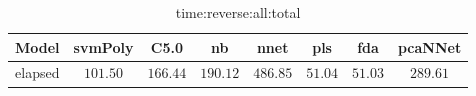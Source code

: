 \begin{table}[!ht]
	\centering
	\begin{tabular}{|c|c|c|c|c|c|c|c|}
		\hline
		Model & svmPoly & C5.0 & nb & nnet & pls & fda & pcaNNet \\ \hline
		elapsed & $101.50$ & $166.44$ & $190.12$ & $486.85$ & $51.04$ & $51.03$ & $289.61$ \\ \hline
	\end{tabular}
	\caption{time:reverse:all:total}
	\label{tab:time:reverse:all:total}
\end{table}
